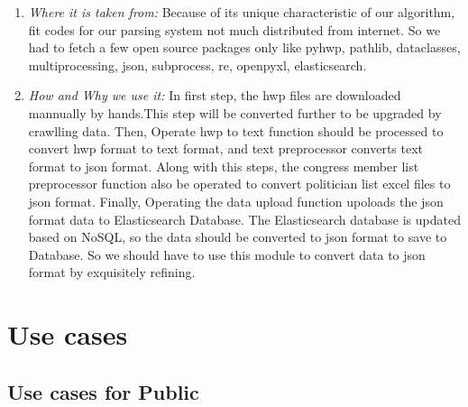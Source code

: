 \documentclass[conference]{IEEEtran}
\begin{document}
\begin{enumerate}
\begin{enumerate}
\end{enumerate}

 
   \item \textit{Where it is taken from: } Because of its unique characteristic of our algorithm, fit codes for our parsing system not much distributed from internet. So we had to fetch a few open source packages only like pyhwp, pathlib, dataclasses, multiprocessing, json, subprocess, re, openpyxl, elasticsearch.\\
   
  \item \textit{How and Why we use it: } In first step, the hwp files are downloaded mannually by hands.This step will be converted further to be upgraded by crawlling data. Then, Operate hwp to text function should be processed to convert hwp format to text format, and text preprocessor converts text format to json format. Along with this steps, the congress member list preprocessor function also be operated to convert politician list excel files to json format. Finally, Operating the data upload function upoloads the json format data to Elasticsearch Database. The Elasticsearch database is updated based on NoSQL, so the data should be converted to json format to save to Database. So we should have to use this module to convert data to json format by exquisitely refining.\\
  \end{enumerate}

\vspace{300mm}
 \section{Use cases}
\subsection{Use cases for Public}
\end{document}
